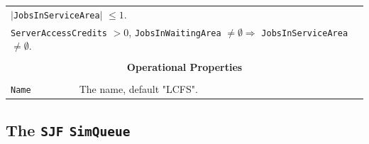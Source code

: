 \documentclass[12pt]{book}
\begin{document}
\begin{tabular}{|l|l|l|l|}
\multicolumn{4}{|l|}{$|$\lstinline|JobsInServiceArea|$|$ $\leq 1$.} \\
\multicolumn{4}{|l|}{\lstinline|ServerAccessCredits| $> 0$, \lstinline|JobsInWaitingArea| $\neq \emptyset
                     \Rightarrow$ \lstinline|JobsInServiceArea| $\neq \emptyset$.} \\
\hline
\multicolumn{4}{|c|}{} \\
\multicolumn{4}{|c|}{\bf Operational Properties} \\
\multicolumn{4}{|c|}{} \\
\hline
\lstinline|Name| & \multicolumn{3}{|l|}{The name, default "LCFS".} \\
\hline
\end{tabular}

\subsection{The \lstinline{SJF} \lstinline{SimQueue}}
\label{sec:SJF}
\end{document}
